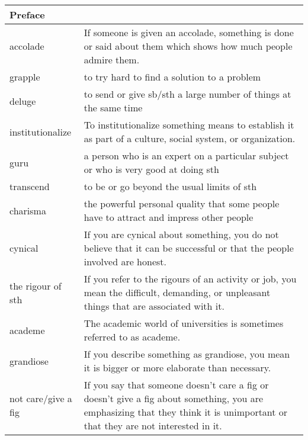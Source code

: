 \documentclass{article}
\begin{document}
\begin{center}
\begin{longtable}{|l|p{7.8cm}|}

\hline
\multicolumn{2}{|l|}{\textbf{Preface}}\\
\hline
accolade
&
If someone is given an accolade, something is done or said about them which shows how much people admire them.
\\

\hline
grapple
&
to try hard to find a solution to a problem
\\

\hline
deluge
&
to send or give sb/sth a large number of things at the same time
\\

\hline
institutionalize
&
To institutionalize something means to establish it as part of a culture, social system, or organization.
\\

\hline
guru
&
a person who is an expert on a particular subject or who is very good at doing sth
\\

\hline
transcend
&
to be or go beyond the usual limits of sth
\\

\hline
charisma
&
the powerful personal quality that some people have to attract and impress other people
\\

\hline
cynical
&
If you are cynical about something, you do not believe that it can be successful or that the people involved are honest.
\\

\hline
the rigour of sth
&
If you refer to the rigours of an activity or job, you mean the difficult, demanding, or unpleasant things that are associated with it.
\\

\hline
academe
&
The academic world of universities is sometimes referred to as academe.
\\

\hline
grandiose
&
If you describe something as grandiose, you mean it is bigger or more elaborate than necessary.
\\

\hline
not care/give a fig
&
If you say that someone doesn't care a fig or doesn't give a fig about something, you are emphasizing that they think it is unimportant or that they are not interested in it.
\\


\end{longtable}
\end{center}
\end{document}
